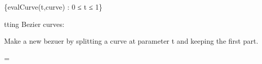 \documentclass{article}
\begin{document}
\begin{Maple Normal}{
\begin{Maple Normal}{
}\end{Maple Normal}
}\end{Maple Normal}
\begin{Maple Normal}{
\begin{Maple Normal}{
\{evalCurve(t,curve) : 0 ≤ t ≤ 1\}}\end{Maple Normal}

}\end{Maple Normal}

\begin{Maple Normal}{
\begin{Maple Normal}{
}\end{Maple Normal}
}\end{Maple Normal}
\begin{Maple Normal}{
\begin{Maple Normal}{
tting Bezier curves:}\end{Maple Normal}

}\end{Maple Normal}

\begin{Maple Normal}{
\begin{Maple Normal}{
}\end{Maple Normal}
}\end{Maple Normal}
\begin{Maple Normal}{
\begin{Maple Normal}{
Make a new bezuer by splitting a curve at parameter t and keeping the first part.}\end{Maple Normal}

}\end{Maple Normal}

\begin{Maple Normal}{
\begin{Maple Normal}{
}\end{Maple Normal}
}\end{Maple Normal}
\begin{Maple Normal}{
\begin{Maple Normal}{
=
}\end{Maple Normal}

}\end{Maple Normal}
\end{document}
